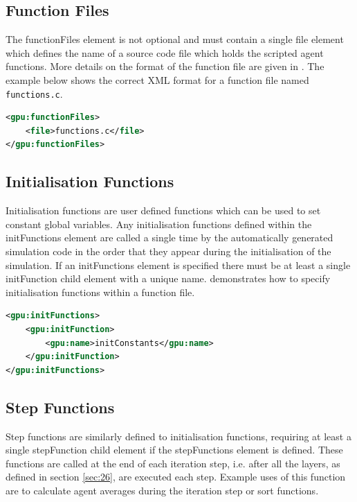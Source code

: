 \documentclass[11pt, a4paper, onecolumn, oneside]{report}
\begin{document}
\subsection{Function Files}
\label{sec:222}


The functionFiles element is not optional and must contain a single file element which defines the name of a source code file which holds the scripted agent functions.
More details on the format of the function file are given in .
The example below shows the correct XML format for a function file named \texttt{functions.c}.

\begin{lstlisting}[language=XML]
<gpu:functionFiles>
    <file>functions.c</file>
</gpu:functionFiles>
\end{lstlisting}

\subsection{Initialisation Functions}
\label{sec:223}


Initialisation functions are user defined functions which can be used to set constant global variables. 
Any initialisation functions defined within the initFunctions element are called a single time by the automatically generated simulation code in the order that they appear during the initialisation of the simulation. 
If an initFunctions element is specified there must be at least a single initFunction child element with a unique name. 
 demonstrates how to specify initialisation functions within a function file.

\begin{lstlisting}[language=XML]
<gpu:initFunctions>
    <gpu:initFunction>
        <gpu:name>initConstants</gpu:name>
    </gpu:initFunction>
</gpu:initFunctions>
\end{lstlisting}


\subsection{Step Functions}
\label{sec:stepFunc}

Step functions are similarly defined to initialisation functions, requiring at least a single stepFunction child element if the stepFunctions element is defined. These functions are called at the end of each iteration step, i.e. after all the layers, as defined in section \ref{sec:26}, are executed each step. Example uses of this function are to calculate agent averages during the iteration step or sort functions.
\end{document}
